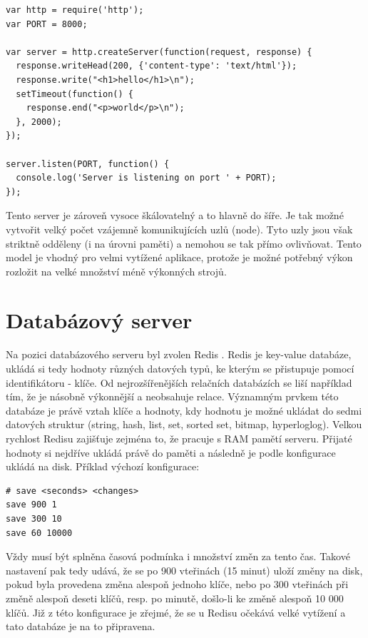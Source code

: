 \begin{verbatim}
var http = require('http');
var PORT = 8000;

var server = http.createServer(function(request, response) {
  response.writeHead(200, {'content-type': 'text/html'});
  response.write("<h1>hello</h1>\n");
  setTimeout(function() {
    response.end("<p>world</p>\n");
  }, 2000);
});

server.listen(PORT, function() {
  console.log('Server is listening on port ' + PORT);
});
\end{verbatim}

Tento server je zároveň vysoce škálovatelný a to hlavně do šíře. Je tak možné vytvořit velký počet vzájemně komunikujících uzlů (node). Tyto uzly jsou však striktně odděleny (i na úrovni paměti) a nemohou se tak přímo ovlivňovat. Tento model je vhodný pro velmi vytížené aplikace, protože je možné potřebný výkon rozložit na velké množství méně výkonných strojů.

\section{Databázový server}
Na pozici databázového serveru byl zvolen Redis \cite{redis}.  Redis je key-value databáze, ukládá  si tedy hodnoty různých datových typů, ke kterým se přistupuje pomocí identifikátoru - klíče. Od nejrozšířenějších relačních databázích se liší například tím, že je násobně výkonnější a neobsahuje relace. Významným prvkem této databáze je právě vztah klíče a hodnoty, kdy hodnotu je možné ukládat do sedmi datových struktur (string, hash, list, set, sorted set, bitmap, hyperloglog). Velkou rychlost Redisu zajišťuje zejména to, že pracuje s RAM pamětí serveru. Přijaté hodnoty si nejdříve ukládá právě do paměti a následně je podle konfigurace ukládá na disk. Příklad výchozí konfigurace:

\begin{verbatim}
# save <seconds> <changes>
save 900 1
save 300 10
save 60 10000
\end{verbatim}

Vždy musí být splněna časová podmínka i množství změn za tento čas. Takové nastavení pak tedy udává, že se po 900 vteřinách (15 minut) uloží změny na disk, pokud byla provedena změna alespoň jednoho klíče, nebo po 300 vteřinách při změně alespoň deseti klíčů, resp. po minutě, došlo-li ke změně alespoň 10 000 klíčů. Již z této konfigurace je zřejmé, že se u Redisu očekává velké vytížení a tato databáze je na to připravena.

